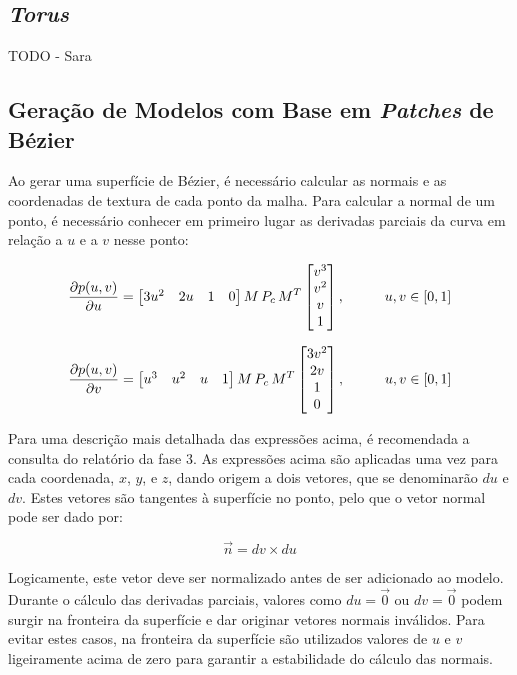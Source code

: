 \documentclass[12pt, a4paper]{article}
\begin{document}
\subsection{\emph{Torus}}

{\color{red} TODO - Sara}

\subsection{Geração de Modelos com Base em \emph{Patches} de Bézier}

Ao gerar uma superfície de Bézier, é necessário calcular as normais e as coordenadas de textura de
cada ponto da malha. Para calcular a normal de um ponto, é necessário conhecer em primeiro lugar as
derivadas parciais da curva em relação a $u$ e a $v$ nesse ponto:

$$
\def\arraystretch{1}
\frac{\partial p(u, v)}{\partial u} =
\begin{bmatrix}
    3 u^2 & 2 u & 1 & 0
\end{bmatrix}
M \, P_c \, M^T
\begin{bmatrix}
    v^3 \\ v^2 \\ v \\ 1
\end{bmatrix},
\hspace{1cm}
u, v \in \left [ 0, 1 \right ]
$$

$$
\def\arraystretch{1}
\frac{\partial p(u, v)}{\partial v} =
\begin{bmatrix}
    u^3 & u^2 & u & 1
\end{bmatrix}
M \, P_c \, M^T
\begin{bmatrix}
    3 v^2 \\ 2 v \\ 1 \\ 0
\end{bmatrix},
\hspace{1cm}
u, v \in \left [ 0, 1 \right ]
$$

Para uma descrição mais detalhada das expressões acima, é recomendada a consulta do relatório da
fase 3. As expressões acima são aplicadas uma vez para cada coordenada, $x$, $y$, e $z$, dando
origem a dois vetores, que se denominarão $du$ e $dv$. Estes vetores são tangentes à superfície no
ponto, pelo que o vetor normal pode ser dado por:

$$
\vec{n} = dv \times du
$$

Logicamente, este vetor deve ser normalizado antes de ser adicionado ao modelo. Durante o cálculo
das derivadas parciais, valores como $du = \vec{0}$ ou $dv = \vec{0}$ podem surgir na fronteira da
superfície e dar originar vetores normais inválidos. Para evitar estes casos, na fronteira da
superfície são utilizados valores de $u$ e $v$ ligeiramente acima de zero para garantir a
estabilidade do cálculo das normais.
\end{document}
